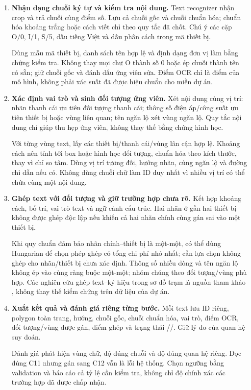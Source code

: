 \documentclass[11pt,a4paper]{article}
\newcommand{\code}[1]{\texttt{\detokenize{#1}}}
\begin{document}
\begin{enumerate}
  Bộ phân loại hướng dòng PP-LCNet được tài liệu PaddleOCR mô tả với hai lớp 0 và 180 độ \cite{paddleori}. Do đó, không mặc định bật mô-đun này là đã giải quyết mọi nhãn 90/270 độ. Việc định hướng crop cục bộ thuộc pipeline OCR, không mở rộng thành nghiên cứu khử nghiêng toàn trang.

  \item \textbf{Nhận dạng chuỗi ký tự và kiểm tra nội dung.}
  Text recognizer nhận crop và trả chuỗi cùng điểm số. Lưu cả chuỗi gốc và chuỗi chuẩn hóa; chuẩn hóa khoảng trắng hoặc cách viết chỉ theo quy tắc đã chốt. Chú ý các cặp O/0, I/1, S/5, dấu tiếng Việt và dấu phân cách trong mã thiết bị.

  Dùng mẫu mã thiết bị, danh sách tên hợp lệ và định dạng đơn vị làm bằng chứng kiểm tra. Không thay mọi chữ O thành số 0 hoặc ép chuỗi thành tên có sẵn; giữ chuỗi gốc và đánh dấu ứng viên sửa. Điểm OCR chỉ là điểm của mô hình, không phải xác suất đã được hiệu chuẩn cho miền dự án.

  \item \textbf{Xác định vai trò và sinh đối tượng ứng viên.}
  Xét nội dung cùng vị trí: nhãn thanh cái ưu tiên đối tượng thanh cái; thông số điện áp/công suất ưu tiên thiết bị hoặc vùng liên quan; tên ngăn lộ xét vùng ngăn lộ. Quy tắc nội dung chỉ giúp thu hẹp ứng viên, không thay thế bằng chứng hình học.

  Với từng vùng text, lấy các thiết bị/thanh cái/vùng lân cận hợp lệ. Khoảng cách nên tính tới box hoặc hình học đối tượng, chuẩn hóa theo kích thước, thay vì chỉ so tâm. Dùng vị trí tương đối, hướng nhãn, cùng ngăn lộ và đường chỉ dẫn nếu có. Không dùng chuỗi chữ làm ID duy nhất vì nhiều vị trí có thể chứa cùng một nội dung.

  \item \textbf{Ghép text với đối tượng và giữ trường hợp chưa rõ.}
  Kết hợp khoảng cách, bố trí, vai trò text và ngữ cảnh cấu trúc. Hai nhãn ở gần hai thiết bị không được ghép độc lập nếu khiến cả hai nhãn chính cùng gán sai vào một thiết bị.

  Khi quy chuẩn đảm bảo nhãn chính--thiết bị là một-một, có thể dùng Hungarian để chọn phép ghép có tổng chi phí nhỏ nhất; cần lựa chọn không ghép cho nhãn/thiết bị chưa xác định. Thông số nhiều dòng và tên ngăn lộ không ép vào cùng ràng buộc một-một; nhóm chúng theo đối tượng/vùng phù hợp. Các nghiên cứu ghép text--ký hiệu trong sơ đồ trạm là nguồn tham khảo \cite{skid}, không thay thế kiểm chứng trên dữ liệu của dự án.

  \item \textbf{Xuất kết quả và đánh giá riêng từng bước.}
  Mỗi text lưu ID riêng, polygon toàn trang, hướng, chuỗi gốc, chuỗi chuẩn hóa, vai trò, điểm OCR, đối tượng/vùng được gán, điểm ghép và trạng thái \code{matched}/\code{unmatched}/\code{ambiguous}. Giữ lý do của quan hệ suy đoán.

  Đánh giá phát hiện vùng chữ, độ đúng chuỗi và độ đúng quan hệ riêng. Đọc đúng C11 nhưng gán sang C12 vẫn là lỗi hệ thống. Chọn ngưỡng bằng validation và báo cáo cả tỷ lệ cần kiểm tra, không chỉ độ chính xác các trường hợp đã được chấp nhận.
\end{enumerate}
\end{document}
